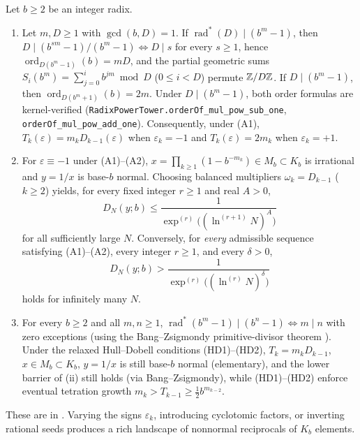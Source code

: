 \documentclass[11pt]{article}
\DeclareMathOperator{\ord}{ord}
\DeclareMathOperator{\rad}{rad}
\newcommand{\ttt}[1]{\texttt{#1}}
\begin{document}
\begin{maintheorem}\label{thm:B}
Let $b\ge2$ be an integer radix.
\begin{enumerate}[label=\textup{(\roman*)},nosep]
\item {} Let $m,D\ge1$ with $\gcd(b,D)=1$. If $\rad^*(D)\mid(b^m-1)$, then $D\mid(b^{sm}-1)/(b^m-1)\iff D\mid s$ for every $s\ge1$, hence $\ord_{D(b^m-1)}(b)=mD$, and the partial geometric sums $S_i(b^m)=\sum_{j=0}^i b^{jm}\bmod D$ ($0\le i<D$) permute $\mathbb Z/D\mathbb Z$. If $D\mid(b^m-1)$, then $\ord_{D(b^m+1)}(b)=2m$. Under $D\mid(b^m-1)$, both order formulas are kernel-verified (\ttt{RadixPowerTower.orderOf\_mul\_pow\_sub\_one}, \ttt{orderOf\_mul\_pow\_add\_one}). Consequently, under \textup{(A1)}, $T_k(\varepsilon)=m_k D_{k-1}(\varepsilon)$ when $\varepsilon_k=-1$ and $T_k(\varepsilon)=2m_k$ when $\varepsilon_k=+1$.
\item {} For $\varepsilon\equiv-1$ under \textup{(A1)}--\textup{(A2)}, $x=\prod_{k\ge1}(1-b^{-m_k})\in M_b\subset K_b$ is irrational and $y=1/x$ is base-$b$ normal. Choosing balanced multipliers $\omega_k=D_{k-1}$ ($k\ge2$) yields, for every fixed integer $r\ge1$ and real $A>0$,
\[
D_N(y;b)\le\frac1{\exp^{(r)}\bigl((\ln^{(r+1)}N)^A\bigr)}
\]
for all sufficiently large $N$. Conversely, for \emph{every} admissible sequence satisfying \textup{(A1)}--\textup{(A2)}, every integer $r\ge1$, and every $\delta>0$,
\[
D_N(y;b)>\frac1{\exp^{(r)}\bigl((\ln^{(r)}N)^\delta\bigr)}
\]
holds for infinitely many $N$.
\item {} For every $b\ge2$ and all $m,n\ge1$, $\rad^*(b^m-1)\mid(b^n-1)\iff m\mid n$ with zero exceptions (using the Bang--Zsigmondy primitive-divisor theorem \cite{Bang1886,Zsigmondy1892}). Under the relaxed Hull--Dobell conditions \textup{(HD1)}--\textup{(HD2)}, $T_k=m_k D_{k-1}$, $x\in M_b\subset K_b$, $y=1/x$ is still base-$b$ normal (elementary), and the lower barrier of \textup{(ii)} still holds (via Bang--Zsigmondy), while \textup{(HD1)}--\textup{(HD2)} enforce eventual tetration growth $m_k>T_{k-1}\ge\frac12 b^{m_{k-2}}$.
\end{enumerate}
\end{maintheorem}

These are  in . Varying the signs $\varepsilon_k$, introducing cyclotomic factors, or inverting rational seeds produces a rich landscape of nonnormal reciprocals of $K_b$ elements.
\end{document}

